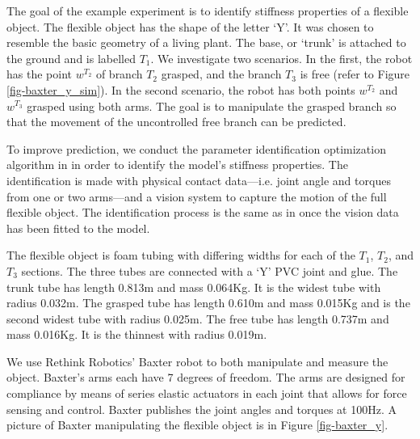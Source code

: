 \documentclass[runningheads,a4paper]{llncs}
\begin{document}
The goal of the example experiment is to identify stiffness properties of a flexible object. The flexible object has the shape of the letter `Y'.  It was chosen to resemble the basic geometry of a living plant. The base, or `trunk' is attached to the ground and is labelled $T_1$. We investigate two scenarios. In the first, the robot has the point $w^{T_2}$ of branch $T_2$ grasped, and the branch $T_3$ is free (refer to Figure \ref{fig-baxter_y_sim}).  In the second scenario, the robot has both points $w^{T_2}$ and $w^{T_3}$ grasped using both arms. The goal is to manipulate the grasped branch so that the movement of the uncontrolled free branch can be predicted. %

To improve prediction, we conduct the parameter identification optimization algorithm in \cite{caldwell_coleman_correll_iros} in order to identify the model's stiffness properties. The identification is made with physical contact data---i.e. joint angle and torques from one or two arms---and a vision system to capture the motion of the full flexible object. The identification process is the same as in \cite{caldwell_coleman_correll_iros} once the vision data has been fitted to the model. %

The flexible object is foam tubing with differing widths for each of the $T_1$, $T_2$, and $T_3$ sections. The three tubes are connected with a `Y' PVC joint and glue.  The trunk tube has length 0.813m and mass 0.064Kg. It is the widest tube with radius 0.032m. The grasped tube has length 0.610m and mass 0.015Kg and is the second widest tube with radius 0.025m. The free tube has length 0.737m and mass 0.016Kg. It is the thinnest with radius 0.019m.  %

We use Rethink Robotics' Baxter robot \cite{guizzo2011rethink} to both manipulate and measure the object.  Baxter's arms each have 7 degrees of freedom.  The arms are designed for compliance by means of series elastic actuators in each joint that allows for force sensing and control.  Baxter publishes the joint angles and torques at 100Hz.  A picture of Baxter manipulating the flexible object is in Figure \ref{fig-baxter_y}. 
\end{document}
